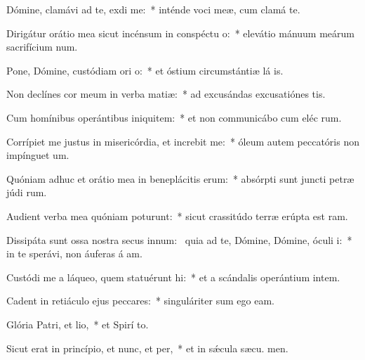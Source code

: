 \item Dómine, clamávi ad te, exdi me:~* inténde voci meæ, cum clamá  te.
\item Dirigátur orátio mea sicut incénsum in conspéctu o:~* elevátio mánuum meárum sacrifícium num.
\item Pone, Dómine, custódiam ori o:~* et óstium circumstántiæ lá is.
\item Non declínes cor meum in verba matiæ:~* ad excusándas excusatiónes  tis.
\item Cum homínibus operántibus iniquitem:~* et non communicábo cum eléc rum.
\item Corrípiet me justus in misericórdia, et increbit me:~* óleum autem peccatóris non impínguet  um.
\item Quóniam adhuc et orátio mea in beneplácitis erum:~* absórpti sunt juncti petræ júdi rum.
\item Audient verba mea quóniam poturunt:~* sicut crassitúdo terræ erúpta est  ram.
\item Dissipáta sunt ossa nostra secus innum:~\pscross{} quia ad te, Dómine, Dómine, óculi i:~* in te sperávi, non áuferas á am.
\item Custódi me a láqueo, quem statuérunt hi:~* et a scándalis operántium intem.
\item Cadent in retiáculo ejus peccares:~* singuláriter sum ego  eam.
\item Glória Patri, et lio,~* et Spirí to.
\item Sicut erat in princípio, et nunc, et per,~* et in sǽcula sæcu. men.
